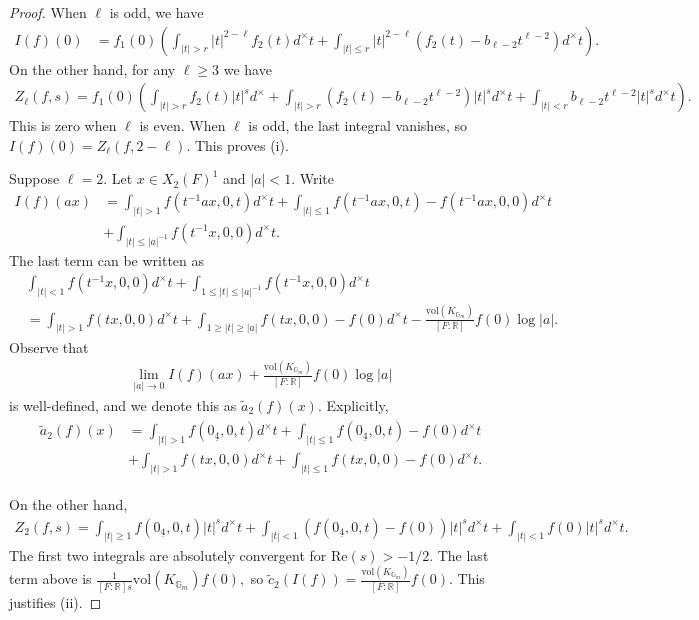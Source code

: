 \documentclass[10pt,a4paper]{amsart}
\newcommand{\GG}{\mathbb{G}}
\newcommand{\RR}{\mathbb{R}}
\begin{document}
\begin{proof}
    When $\ell$ is odd, we have 
    \begin{align*}
        I(f)(0)&=f_1(0)\left(\int_{|t|>r} |t|^{2-\ell}f_2(t) d^\times t+\int_{|t|\le r} |t|^{2-\ell}\left(f_2(t)-b_{\ell-2}t^{\ell-2}\right) d^\times t\right).
    \end{align*}
    On the other hand, for any $\ell\ge 3$ we have
    \begin{align*}
        Z_\ell(f,s)=f_1(0)\left(\int_{|t|>r} f_2(t)|t|^{s}d^\times+\int_{|t|>r} (f_2(t)-b_{\ell-2}t^{\ell-2})|t|^sd^\times t+\int_{|t|<r} b_{\ell-2}t^{\ell-2}|t|^s d^\times t\right).
    \end{align*}
    This is zero when $\ell$ is even. When $\ell$ is odd, the last integral vanishes, so $I(f)(0)=Z_\ell(f,2-\ell).$ This proves (i). 
    
    Suppose $\ell=2$. Let $x\in X_2(F)^1 $ and $|a|<1$. Write
    \begin{align*}
        I(f)(ax)&=\int_{|t|>1} f(t^{-1}ax,0,t)d^\times t+ \int_{|t|\le 1} f(t^{-1}ax,0,t)-f(t^{-1}ax,0,0)d^\times t\\
        &+\int_{|t|\le |a|^{-1}} f(t^{-1}x,0,0)d^\times t.
    \end{align*}
    The last term can be written as
    \begin{align*}
         &\int_{|t|< 1} f(t^{-1}x,0,0)d^\times t+\int_{1\le |t|\le |a|^{-1}} f(t^{-1}x,0,0)d^\times t\\
    &=\int_{|t|> 1} f(tx,0,0)d^\times t+\int_{1\ge |t|\ge|a|} f(tx,0,0)-f(0)d^\times t -\frac{\mathrm{vol}(K_{\GG_m})}{[F:\RR]}f(0)\log |a|.
    \end{align*}
    Observe that
    \begin{align*}
        \lim_{|a|\to 0} I(f)(ax)+\frac{\mathrm{vol}(K_{\GG_m})}{[F:\RR]}f(0)\log |a| 
    \end{align*}
    is well-defined, and we denote this as $\tilde{a}_2(f)(x)$. Explicitly,
    \begin{align}\label{eq:a2:arch}
    \begin{split}
        \tilde{a}_2(f)(x)&=\int_{|t|>1} f(0_{\underline{4}},0,t)d^\times t+ \int_{|t|\le 1} f(0_{\underline{4}},0,t)-f(0)d^\times t\\
        &+\int_{|t|> 1} f(tx,0,0)d^\times t+\int_{|t|\le 1} f(tx,0,0)-f(0)d^\times t.
    \end{split}
    \end{align}
    
    
    On the other hand,
    \begin{align}\label{eq:Z2compute}
        Z_2(f,s)=\int_{|t|\ge 1} f(0_{\underline{4}},0,t)|t|^s d^\times t+\int_{|t|<1} (f(0_{\underline{4}},0,t)-f(0))|t|^s d^\times t+\int_{|t|<1} f(0)|t|^s d^\times t.
    \end{align}
    The first two integrals are absolutely convergent for $\mathrm{Re}(s)>-1/2$. The last term above is $\frac{1}{[F:\RR]s}\mathrm{vol}(K_{\GG_m})f(0),$ so $\tilde{c}_2(I(f))=\frac{\mathrm{vol}(K_{\GG_m})}{[F:\RR]}f(0).$ This justifies (ii).
\end{proof}
\end{document}
